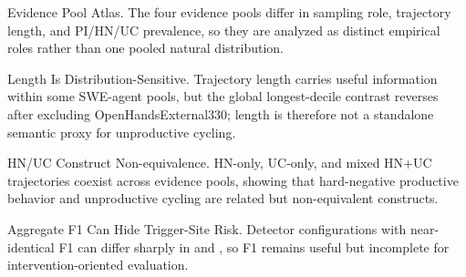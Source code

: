 
\caption{Evidence Pool Atlas. The four evidence pools differ in sampling role, trajectory length, and PI/HN/UC prevalence, so they are analyzed as distinct empirical roles rather than one pooled natural distribution.}

\caption{Length Is Distribution-Sensitive. Trajectory length carries useful information within some SWE-agent pools, but the global longest-decile contrast reverses after excluding OpenHandsExternal330; length is therefore not a standalone semantic proxy for unproductive cycling.}

\caption{HN/UC Construct Non-equivalence. HN-only, UC-only, and mixed HN+UC trajectories coexist across evidence pools, showing that hard-negative productive behavior and unproductive cycling are related but non-equivalent constructs.}

\caption{Aggregate F1 Can Hide Trigger-Site Risk. Detector configurations with near-identical F1 can differ sharply in \piir{} and \hnfpr{}, so F1 remains useful but incomplete for intervention-oriented evaluation.}
